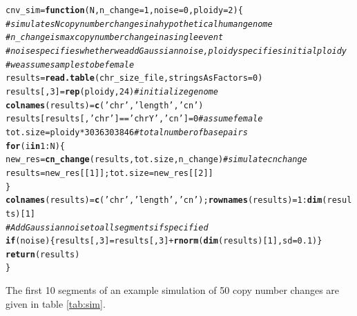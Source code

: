 \documentclass[12pt]{article}\usepackage[]{graphicx}\usepackage[]{color}
\makeatletter
\newcommand{\hlnum}[1]{\textcolor[rgb]{0.686,0.059,0.569}{#1}}%
\newcommand{\hlstr}[1]{\textcolor[rgb]{0.192,0.494,0.8}{#1}}%
\newcommand{\hlcom}[1]{\textcolor[rgb]{0.678,0.584,0.686}{\textit{#1}}}%
\newcommand{\hlopt}[1]{\textcolor[rgb]{0,0,0}{#1}}%
\newcommand{\hlstd}[1]{\textcolor[rgb]{0.345,0.345,0.345}{#1}}%
\newcommand{\hlkwa}[1]{\textcolor[rgb]{0.161,0.373,0.58}{\textbf{#1}}}%
\newcommand{\hlkwb}[1]{\textcolor[rgb]{0.69,0.353,0.396}{#1}}%
\newcommand{\hlkwc}[1]{\textcolor[rgb]{0.333,0.667,0.333}{#1}}%
\newcommand{\hlkwd}[1]{\textcolor[rgb]{0.737,0.353,0.396}{\textbf{#1}}}%
\newenvironment{kframe}{%
 \def\at@end@of@kframe{}%
 \ifinner\ifhmode%
  \def\at@end@of@kframe{\end{minipage}}%
  \begin{minipage}{\columnwidth}%
 \fi\fi%
 \def\FrameCommand##1{\hskip\@totalleftmargin \hskip-\fboxsep
 \colorbox{shadecolor}{##1}\hskip-\fboxsep
     \hskip-\linewidth \hskip-\@totalleftmargin \hskip\columnwidth}%
 \MakeFramed {\advance\hsize-\width
   \@totalleftmargin\z@ \linewidth\hsize
   \@setminipage}}%
 {\par\unskip\endMakeFramed%
 \at@end@of@kframe}
\makeatother
\begin{document}
\begin{kframe}
\begin{alltt}
\hlstd{cnv_sim} \hlkwb{=} \hlkwa{function}\hlstd{(}\hlkwc{N}\hlstd{,} \hlkwc{n_change} \hlstd{=} \hlnum{1}\hlstd{,} \hlkwc{noise} \hlstd{=} \hlnum{0}\hlstd{,} \hlkwc{ploidy}\hlstd{=}\hlnum{2}\hlstd{)\{}
  \hlcom{#simulates N copy number changes in a hypothetical human genome}
  \hlcom{#n_change is max copy number change in a single event}
  \hlcom{#noise specifies whether we add Gaussian noise, ploidy specifies initial ploidy}
  \hlcom{#we assume samples to be female}
  \hlstd{results} \hlkwb{=} \hlkwd{read.table}\hlstd{(chr_size_file,} \hlkwc{stringsAsFactors} \hlstd{=} \hlnum{0}\hlstd{)}
  \hlstd{results[,}\hlnum{3}\hlstd{]} \hlkwb{=} \hlkwd{rep}\hlstd{(ploidy,}\hlnum{24}\hlstd{)} \hlcom{#initialize genome}
  \hlkwd{colnames}\hlstd{(results)} \hlkwb{=} \hlkwd{c}\hlstd{(}\hlstr{'chr'}\hlstd{,} \hlstr{'length'}\hlstd{,} \hlstr{'cn'}\hlstd{)}
  \hlstd{results[results[,}\hlstr{'chr'}\hlstd{]} \hlopt{==} \hlstr{'chrY'}\hlstd{,} \hlstr{'cn'}\hlstd{]} \hlkwb{=} \hlnum{0} \hlcom{#assume female}
  \hlstd{tot.size} \hlkwb{=} \hlstd{ploidy}\hlopt{*}\hlnum{3036303846} \hlcom{#total number of base pairs}
  \hlkwa{for} \hlstd{(i} \hlkwa{in} \hlnum{1}\hlopt{:}\hlstd{N)\{}
    \hlstd{new_res} \hlkwb{=} \hlkwd{cn_change}\hlstd{(results, tot.size, n_change)} \hlcom{#simulate cn change}
    \hlstd{results} \hlkwb{=} \hlstd{new_res[[}\hlnum{1}\hlstd{]]; tot.size} \hlkwb{=} \hlstd{new_res[[}\hlnum{2}\hlstd{]]}
  \hlstd{\}}
  \hlkwd{colnames}\hlstd{(results)}\hlkwb{=}\hlkwd{c}\hlstd{(}\hlstr{'chr'}\hlstd{,} \hlstr{'length'}\hlstd{,} \hlstr{'cn'}\hlstd{);} \hlkwd{rownames}\hlstd{(results)}\hlkwb{=}\hlnum{1}\hlopt{:}\hlkwd{dim}\hlstd{(results)[}\hlnum{1}\hlstd{]}
  \hlcom{#Add Gaussian noise to all segments if specified}
  \hlkwa{if} \hlstd{(noise)\{ results[,}\hlnum{3}\hlstd{]} \hlkwb{=} \hlstd{results[,}\hlnum{3}\hlstd{]} \hlopt{+} \hlkwd{rnorm}\hlstd{(}\hlkwd{dim}\hlstd{(results)[}\hlnum{1}\hlstd{],} \hlkwc{sd}\hlstd{=}\hlnum{0.1}\hlstd{) \}}
  \hlkwd{return}\hlstd{(results)}
\hlstd{\}}
\end{alltt}
\end{kframe}

The first 10 segments of an example simulation of 50 copy number changes are given in table \ref{tab:sim}.\\
\end{document}
